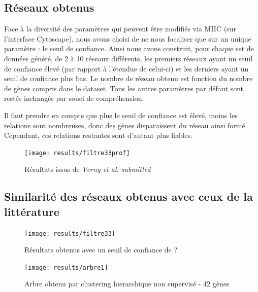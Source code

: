 \documentclass[fleqn,11pt]{SelfArx} %
\begin{document}
\subsection{Réseaux obtenus}
Face à la diversité des paramètres qui peuvent être modifiés via MIIC (sur l'interface Cytoscape), nous avons choisi de ne nous focaliser que sur un unique paramètre : le seuil de confiance. Ainsi nous avons construit, pour chaque set de données généré, de 2 à 10 réseaux différents, les premiers réseaux ayant un seuil de confiance élevé (par rapport à l'étendue de celui-ci) et les derniers ayant un seuil de confiance plus bas. Le nombre de réseau obtenu est fonction du nombre de gènes compris dans le dataset. Tous les autres paramètres par défaut sont restés inchangés par souci de compréhension. 



Il faut prendre en compte que plus le seuil de confiance est élevé, moins les relations sont nombreuses, donc des gènes disparaissent du réseau ainsi formé. Cependant, ces relations restantes sont d'autant plus fiables. 
\begin{figure}[ht]
\centering
\texttt{[image: results/filtre33prof]}
\caption{Résultats issus de \textit{Verny et al. submitted}}
\label{fig:filtre33prof}
\end{figure}

\subsection{Similarité des réseaux obtenus avec ceux de la littérature}
\begin{figure}[ht]
\centering
\texttt{[image: results/filtre33]}
\caption{Résultats obtenus avec un seuil de confiance de ? }
\label{fig:filtre33}
\end{figure}




\begin{figure}[ht]
\centering
\texttt{[image: results/arbre1]}
\caption{Arbre obtenu par clustering hierarchique non supervisé - 42 gènes}
\label{fig:arbre1}
\end{figure}
\end{document}
